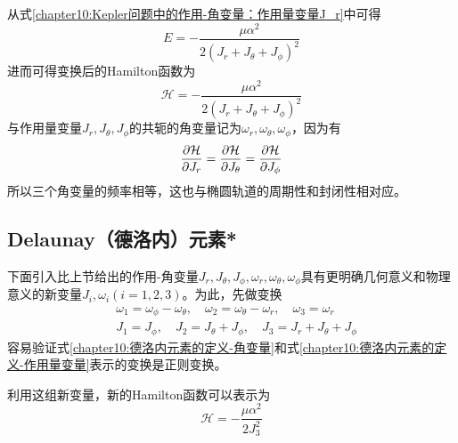 从式\eqref{chapter10:Kepler问题中的作用-角变量：作用量变量J_r}中可得
\begin{equation}
	E = -\frac{\mu\alpha^2}{2(J_r+J_\theta+J_\phi)^2}
\end{equation}
进而可得变换后的Hamilton函数为
\begin{equation}
	\mathcal{H} = -\frac{\mu\alpha^2}{2(J_r+J_\theta+J_\phi)^2}
\end{equation}
与作用量变量$J_r, J_\theta, J_\phi$的共轭的角变量记为$\omega_r, \omega_\theta, \omega_\phi$，因为有
\begin{equation*}
	\frac{\partial \mathcal{H}}{\partial J_r} = \frac{\partial \mathcal{H}}{\partial J_\theta} = \frac{\partial \mathcal{H}}{\partial J_\phi}
\end{equation*}
所以三个角变量的频率相等，这也与椭圆轨道的周期性和封闭性相对应。

\subsection{Delaunay（德洛内）元素*}

下面引入比上节给出的作用-角变量$J_r, J_\theta, J_\phi, \omega_r, \omega_\theta, \omega_\phi$具有更明确几何意义和物理意义的新变量$J_i, \omega_i(i=1,2,3)$。为此，先做变换
\begin{align}
	& \omega_1 = \omega_\phi-\omega_\theta,\quad \omega_2 = \omega_\theta-\omega_r,\quad \omega_3 = \omega_r \label{chapter10:德洛内元素的定义-角变量} \\
	& J_1 = J_\phi,\quad J_2 = J_\theta+J_\phi,\quad J_3 = J_r+J_\theta+J_\phi \label{chapter10:德洛内元素的定义-作用量变量}
\end{align}
容易验证式\eqref{chapter10:德洛内元素的定义-角变量}和式\eqref{chapter10:德洛内元素的定义-作用量变量}表示的变换是正则变换。

利用这组新变量，新的Hamilton函数可以表示为
\begin{equation}
	\mathcal{H} = -\frac{\mu\alpha^2}{2J_3^2}
\end{equation}

